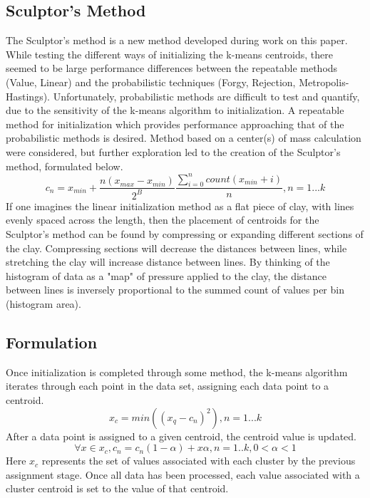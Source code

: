 \documentclass[journal]{IEEEtran}
\begin{document}
\subsection{Sculptor's Method}
The Sculptor's method is a new method developed during work on this paper. While testing the different ways of initializing the k-means centroids, there
seemed to be large performance differences between the repeatable methods (Value, Linear) and the probabilistic techniques (Forgy, Rejection, 
Metropolis-Hastings). Unfortunately, probabilistic methods are difficult to test and quantify, due to the sensitivity of the k-means algorithm to
initialization. A repeatable method for initialization which provides performance approaching that of the probabilistic methods is desired. 
Method based on a center(s) of mass calculation were considered, but further exploration led to the creation of the 
Sculptor's method, formulated below.
\begin{equation}
    c_n = x_{min} + \frac{n(x_{max}-x_{min})}{2^B}\frac{\sum_{i=0}^{n}count(x_{min}+i)}{n}, n = 1...k 
\end{equation}
If one imagines the linear initialization method as a flat piece of clay, with lines evenly spaced across the length, then the placement of
centroids for the Sculptor's method can be found by compressing or expanding different sections of the clay. Compressing sections will decrease the
distances between lines, while stretching the clay will increase distance between lines. By thinking of the histogram of data as a "map" of pressure
applied to the clay, the distance between lines is inversely proportional to the summed count of values per bin (histogram area).

\subsection{Formulation}
Once initialization is completed through some method, the k-means algorithm iterates through each point in the data set, assigning each data point to a
centroid.
\begin{equation}
    x_c = min((x_q - c_n)^2), n = 1...k
\end{equation}
After a data point is assigned to a given centroid, the centroid value is updated.
\begin{equation}
    \forall x \in {x_c}, c_n = c_n(1-\alpha) + x\alpha, n = 1..k, 0 < \alpha < 1
\end{equation}
Here $x_c$ represents the set of values associated with each cluster by the previous assignment stage.
Once all data has been processed, each value associated with a cluster centroid is set to the value of that centroid. \cite{meansWeb}
\end{document}
